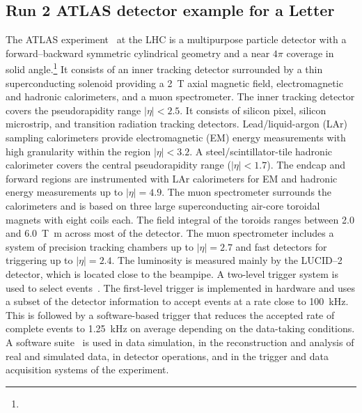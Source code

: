 \subsection{Run 2 ATLAS detector example for a Letter}
\label{sec:atlas2a}

The ATLAS experiment~\cite{PERF-2007-01} at the LHC is a multipurpose particle detector
with a forward--backward symmetric cylindrical geometry and a near \(4\pi\) coverage in 
solid angle.\footnote{\AtlasCoordFootnote}
It consists of an inner tracking detector surrounded by a thin superconducting solenoid
providing a \qty{2}{\tesla} axial magnetic field, electromagnetic and hadronic calorimeters, and a muon spectrometer.
The inner tracking detector covers the pseudorapidity range \(|\eta| < 2.5\).
It consists of silicon pixel, silicon microstrip, and transition radiation tracking detectors.
Lead/liquid-argon (LAr) sampling calorimeters provide electromagnetic (EM) energy measurements
with high granularity within the region \(|\eta|< 3.2\).
A steel/scintillator-tile hadronic calorimeter covers the central pseudorapidity range (\(|\eta| < 1.7\)).
The endcap and forward regions are instrumented with LAr calorimeters
for EM and hadronic energy measurements up to \(|\eta| = 4.9\).
The muon spectrometer surrounds the calorimeters and is based on
three large superconducting air-core toroidal magnets with eight coils each.
The field integral of the toroids ranges between \num{2.0} and \qty{6.0}{\tesla\metre}
across most of the detector. 
The muon spectrometer includes a system of precision tracking chambers up to \(|\eta| = 2.7\) and fast detectors for triggering up to \(|\eta| = 2.4\).
The luminosity is measured mainly by the LUCID--2~\cite{LUCID2} detector, which is located close to the beampipe.
A two-level trigger system is used to select events~\cite{TRIG-2016-01}. 
The first-level trigger is implemented in hardware and uses a subset of the detector information
to accept events at a rate close to \qty{100}{\kHz}.
This is followed by a software-based trigger that
reduces the accepted rate of complete events to \qty{1.25}{\kHz} on average
depending on the data-taking conditions.
A software suite~\cite{SOFT-2022-02} is used in data simulation, in the reconstruction
and analysis of real and simulated data, in detector operations, and in the trigger and data acquisition
systems of the experiment.

